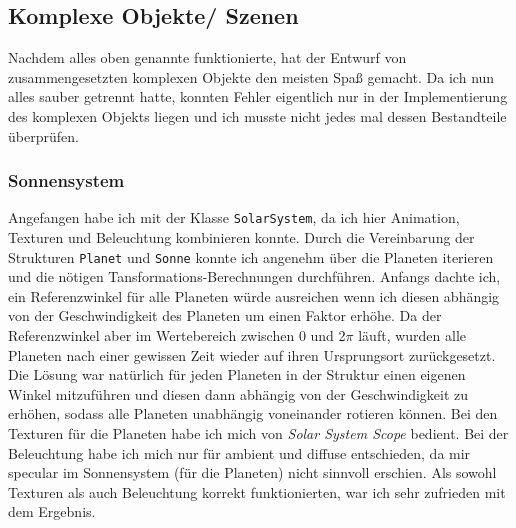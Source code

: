 \documentclass{article}
\let\oldsubsection\subsection
\renewcommand\subsection{\needspace{5\baselineskip}\oldsubsection}
\let\oldsubsubsection\subsubsection
\renewcommand\subsubsection{\needspace{5\baselineskip}\oldsubsubsection}
\begin{document}
\subsection{Komplexe Objekte/ Szenen} \label{sec:complex-objects}
Nachdem alles oben genannte funktionierte, hat der Entwurf von zusammengesetzten komplexen Objekte den meisten Spaß gemacht.
Da ich nun alles sauber getrennt hatte, konnten Fehler eigentlich nur in der Implementierung des komplexen Objekts liegen und ich musste nicht jedes mal dessen Bestandteile überprüfen.

\subsubsection{Sonnensystem} \label{sec::solar-system}
Angefangen habe ich mit der Klasse \texttt{SolarSystem}, da ich hier Animation, Texturen und Beleuchtung kombinieren konnte.
Durch die Vereinbarung der Strukturen \texttt{Planet} und \texttt{Sonne} konnte ich angenehm über die Planeten iterieren und die nötigen Tansformations-Berechnungen durchführen.
Anfangs dachte ich, ein Referenzwinkel für alle Planeten würde ausreichen wenn ich diesen abhängig von der Geschwindigkeit des Planeten um einen Faktor erhöhe.
Da der Referenzwinkel aber im Wertebereich zwischen 0 und 2$\pi$ läuft, wurden alle Planeten nach einer gewissen Zeit wieder auf ihren Ursprungsort zurückgesetzt.
Die Lösung war natürlich für jeden Planeten in der Struktur einen eigenen Winkel mitzuführen und diesen dann abhängig von der Geschwindigkeit zu erhöhen, sodass alle Planeten unabhängig voneinander rotieren können.
Bei den Texturen für die Planeten habe ich mich von \textit{Solar System Scope} \cite{solar-textures} bedient.
Bei der Beleuchtung habe ich mich nur für ambient und diffuse entschieden, da mir specular im Sonnensystem (für die Planeten) nicht sinnvoll erschien.
Als sowohl Texturen als auch Beleuchtung korrekt funktionierten, war ich sehr zufrieden mit dem Ergebnis.
\end{document}
